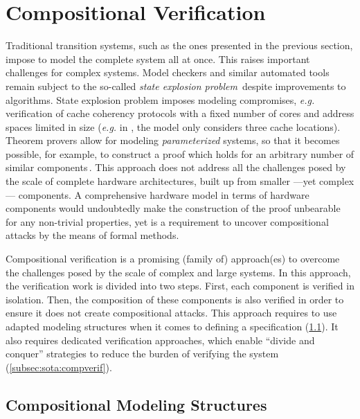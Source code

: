 \section{Compositional Verification}
\label{section:sota:compsec}

Traditional transition systems, such as the ones presented in the previous
section, impose to model the complete system all at once.
%
This raises important challenges for complex systems.
%
Model checkers and similar automated tools remain subject to the so-called
\emph{state explosion problem}\,\cite{clarke2012model} despite improvements to
algorithms.
%
State explosion problem imposes modeling compromises, \emph{e.g.}  verification
of cache coherency protocols with a fixed number of cores and address spaces
limited in size (\emph{e.g.} in \cite{lie2003xom}, the model only considers
three cache locations).
%
Theorem provers allow for modeling \emph{parameterized} systems, so that it
becomes possible, for example, to construct a proof which holds for an arbitrary
number of similar components\,\cite{vijayaraghavan2015modular}.
%
This approach does not address all the challenges posed by the scale of complete
hardware architectures, built up from smaller ---yet complex--- components.
%
A comprehensive hardware model in terms of hardware components would undoubtedly
make the construction of the proof unbearable for any non-trivial properties,
yet is a requirement to uncover compositional attacks by the means of formal
methods.

Compositional verification is a promising (family of) approach(es) to overcome
the challenges posed by the scale of complex and large systems.
%
In this approach, the verification work is divided into two steps.
%
First, each component is verified in isolation.
%
Then, the composition of these components is also verified in order to ensure it
does not create compositional attacks.
%
This approach requires to use adapted modeling structures when it comes to
defining a specification (\ref{subsec:sota:compmod}).
%
It also requires dedicated verification approaches, which enable ``divide and
conquer'' strategies to reduce the burden of verifying the system
(\ref{subsec:sota:compverif}).

\subsection{Compositional Modeling Structures}
\label{subsec:sota:compmod}

